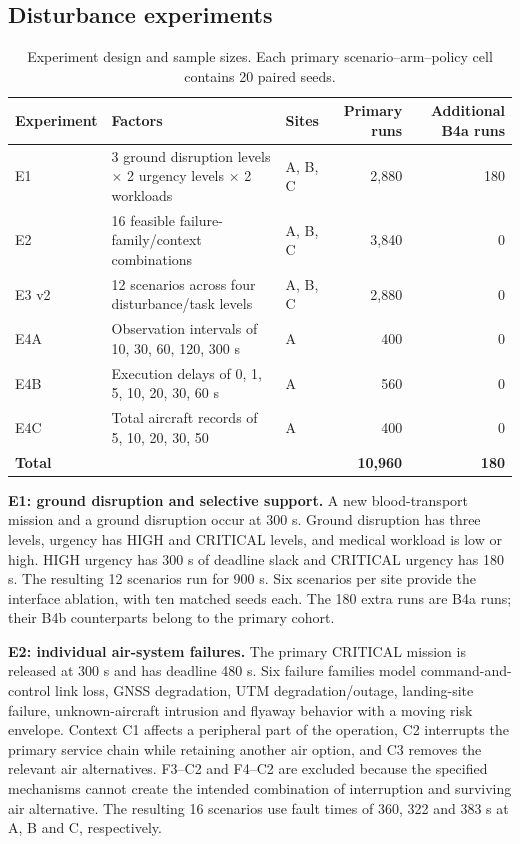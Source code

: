 \documentclass[]{interact}
\theoremstyle{plain}
\theoremstyle{definition}
\theoremstyle{remark}
\begin{document}
\subsection{Disturbance experiments}

\begin{table}[!htbp]
\centering
\small
\setlength{\tabcolsep}{3pt}
\caption{Experiment design and sample sizes. Each primary scenario--arm--policy cell contains 20 paired seeds.}
\label{tab:table4}
\begin{tabularx}{\textwidth}{@{}YYYrr@{}}
\toprule
Experiment & Factors & Sites & Primary runs & Additional B4a runs \\
\midrule
E1 & 3 ground disruption levels $\times$ 2 urgency levels $\times$ 2 workloads & A, B, C & 2,880 & 180 \\
E2 & 16 feasible failure-family/context combinations & A, B, C & 3,840 & 0 \\
E3 v2 & 12 scenarios across four disturbance/task levels & A, B, C & 2,880 & 0 \\
E4A & Observation intervals of 10, 30, 60, 120, 300 s & A & 400 & 0 \\
E4B & Execution delays of 0, 1, 5, 10, 20, 30, 60 s & A & 560 & 0 \\
E4C & Total aircraft records of 5, 10, 20, 30, 50 & A & 400 & 0 \\
\textbf{Total} &  &  & \textbf{10,960} & \textbf{180} \\
\bottomrule
\end{tabularx}
\end{table}

\textbf{E1: ground disruption and selective support.} A new blood-transport mission and a ground disruption occur at 300 s. Ground disruption has three levels, urgency has HIGH and CRITICAL levels, and medical workload is low or high. HIGH urgency has 300 s of deadline slack and CRITICAL urgency has 180 s. The resulting 12 scenarios run for 900 s. Six scenarios per site provide the interface ablation, with ten matched seeds each. The 180 extra runs are B4a runs; their B4b counterparts belong to the primary cohort.

\textbf{E2: individual air-system failures.} The primary CRITICAL mission is released at 300 s and has deadline 480 s. Six failure families model command-and-control link loss, GNSS degradation, UTM degradation/outage, landing-site failure, unknown-aircraft intrusion and flyaway behavior with a moving risk envelope. Context C1 affects a peripheral part of the operation, C2 interrupts the primary service chain while retaining another air option, and C3 removes the relevant air alternatives. F3--C2 and F4--C2 are excluded because the specified mechanisms cannot create the intended combination of interruption and surviving air alternative. The resulting 16 scenarios use fault times of 360, 322 and 383 s at A, B and C, respectively.
\end{document}
